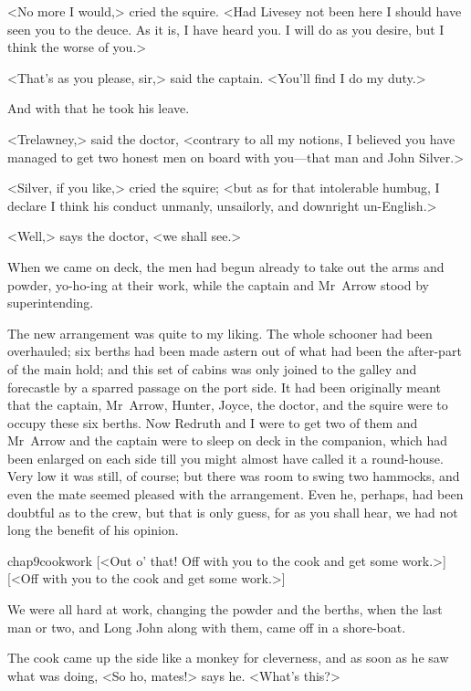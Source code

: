 <No more I would,> cried the squire. <Had Livesey not been here I should have seen you to the deuce. As it is, I have heard you. I will do as you desire, but I think the worse of you.>

<That's as you please, sir,> said the captain. <You'll find I do my duty.>

And with that he took his leave.

<Trelawney,> said the doctor, <contrary to all my notions, I believed you have managed to get two honest men on board with you—that man and John Silver.>

<Silver, if you like,> cried the squire; <but as for that intolerable humbug, I declare I think his conduct unmanly, unsailorly, and downright un-English.>

<Well,> says the doctor, <we shall see.>

When we came on deck, the men had begun already to take out the arms and powder, yo-ho-ing at their work, while the captain and Mr~Arrow stood by superintending.

The new arrangement was quite to my liking. The whole schooner had been overhauled; six berths had been made astern out of what had been the after-part of the main hold; and this set of cabins was only joined to the galley and forecastle by a sparred passage on the port side. It had been originally meant that the captain, Mr~Arrow, Hunter, Joyce, the doctor, and the squire were to occupy these six berths. Now Redruth and I were to get two of them and Mr~Arrow and the captain were to sleep on deck in the companion, which had been enlarged on each side till you might almost have called it a round-house. Very low it was still, of course; but there was room to swing two hammocks, and even the mate seemed pleased with the arrangement. Even he, perhaps, had been doubtful as to the crew, but that is only guess, for as you shall hear, we had not long the benefit of his opinion.

\begin{bwbigpic}
	[\basicscale]
	{chap9cookwork}
	[<Out o' that! Off with you to the cook and get some work.>]
	[<Off with you to the cook and get some work.>]
\end{bwbigpic}

We were all hard at work, changing the powder and the berths, when the last man or two, and Long John along with them, came off in a shore-boat.

The cook came up the side like a monkey for cleverness, and as soon as he saw what was doing, <So ho, mates!> says he. <What's this?>

